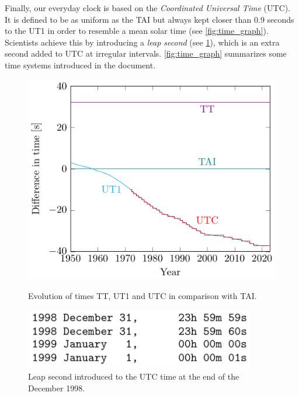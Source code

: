 \documentclass[../main.tex]{subfiles}
\begin{document}
Finally, our everyday clock is based on the \emph{Coordinated Universal Time} (UTC). It is defined to be as uniform as the TAI but always kept closer than 0.9 seconds to the UT1 in order to resemble a mean solar time (see \cref{fig:time_graph}). Scientists achieve this by introducing a \emph{leap second} (see \cref{fig:leapsecond}), which is an extra second added to UTC at irregular intervals. \cref{fig:time_graph} summarizes some time systems introduced in the document.

\begin{figure}[htbp]
  \centering
  \begin{minipage}[ht]{0.45\textwidth}
    \centering
    \includegraphics[width=\textwidth]{Images/time_graph.pdf}
    \caption{Evolution of times TT, UT1 and UTC in comparison with TAI. \cite{iersDeltaT}}
    \label{fig:time_graph}
  \end{minipage}
  \hspace{0.0333333\textwidth}
  \begin{minipage}[ht]{0.45\textwidth}
    \centering
    \includegraphics[width=0.9\textwidth]{Images/leap_second.pdf}
    \caption{Leap second introduced to the UTC time at the end of the December 1998. \cite{iersbulletinC}}
    \label{fig:leapsecond}
  \end{minipage}
\end{figure}
\end{document}
